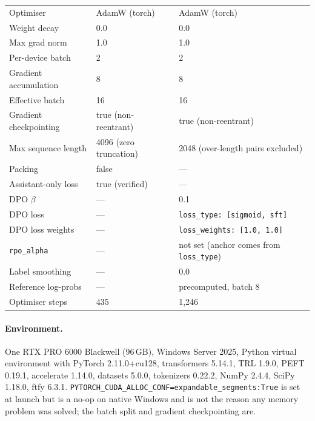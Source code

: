 \begin{table}[h]
\begin{tabular}{lll}
Optimiser             & AdamW (torch)           & AdamW (torch) \\
Weight decay          & 0.0                     & 0.0 \\
Max grad norm         & 1.0                     & 1.0 \\
Per-device batch      & 2                       & 2 \\
Gradient accumulation & 8                       & 8 \\
Effective batch       & 16                      & 16 \\
Gradient checkpointing& true (non-reentrant)    & true (non-reentrant) \\
Max sequence length   & 4096 (zero truncation)  & 2048 (over-length pairs excluded) \\
Packing               & false                   & --- \\
Assistant-only loss   & true (verified)         & --- \\
DPO $\beta$           & ---                     & 0.1 \\
DPO loss              & ---                     & \texttt{loss\_type: [sigmoid, sft]} \\
DPO loss weights      & ---                     & \texttt{loss\_weights: [1.0, 1.0]} \\
\texttt{rpo\_alpha}   & ---                     & not set (anchor comes from \texttt{loss\_type}) \\
Label smoothing       & ---                     & 0.0 \\
Reference log-probs   & ---                     & precomputed, batch 8 \\
Optimiser steps       & 435                     & 1{,}246 \\
\bottomrule
\end{tabular}
\end{table}

\paragraph{Environment.} One RTX PRO 6000 Blackwell (96\,GB), Windows Server 2025,
Python virtual environment with PyTorch 2.11.0+cu128, transformers 5.14.1, TRL 1.9.0,
PEFT 0.19.1, accelerate 1.14.0, datasets 5.0.0, tokenizers 0.22.2, NumPy 2.4.4,
SciPy 1.18.0, ftfy 6.3.1. \texttt{PYTORCH\_CUDA\_ALLOC\_CONF=expandable\_segments:True}
is set at launch but is a no-op on native Windows and is not the reason any memory
problem was solved; the batch split and gradient checkpointing are.

